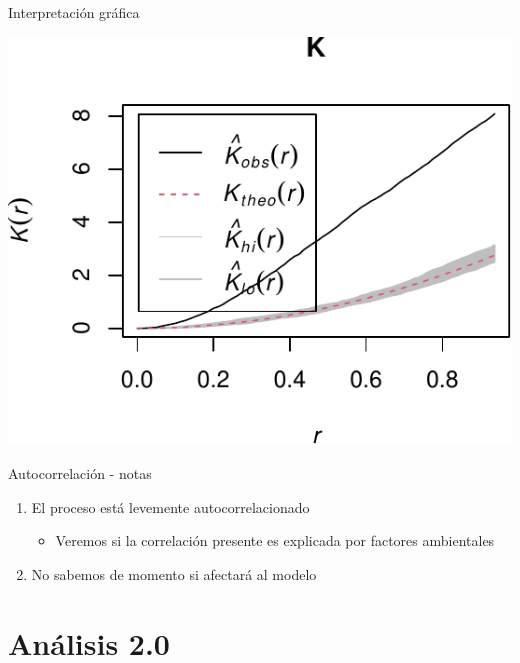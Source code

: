 \documentclass[
  11pt,
  ignorenonframetext,
]{beamer}
\providecommand{\tightlist}{%
  \setlength{\itemsep}{0pt}\setlength{\parskip}{0pt}}
\begin{document}
\begin{frame}{Interpretación gráfica}
\protect\hypertarget{interpretaciuxf3n-gruxe1fica}{}
\begin{center}\includegraphics{Tutorial-spatstat-2_files/figure-beamer/unnamed-chunk-9-1} \end{center}
\end{frame}

\begin{frame}{Autocorrelación - notas}
\protect\hypertarget{autocorrelaciuxf3n---notas}{}
\begin{enumerate}
\item
  El proceso está levemente autocorrelacionado

  \begin{itemize}
  \tightlist
  \item
    Veremos si la correlación presente es explicada por factores
    ambientales
  \end{itemize}
\item
  No sabemos de momento si afectará al modelo
\end{enumerate}
\end{frame}

\hypertarget{anuxe1lisis-2.0}{%
\section{Análisis 2.0}\label{anuxe1lisis-2.0}}
\end{document}

